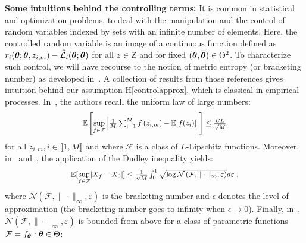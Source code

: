 \documentclass{article}
\newcommand*{\Scale}[2][4]{\scalebox{#1}{$#2$}}%
\begin{document}
\textbf{Some intuitions behind the controlling terms:} It is  common in statistical and optimization problems, to deal with the manipulation and the control of random variables indexed by sets with an infinite number of elements. Here, the controlled random variable is an image of a continuous function defined as $r_i (\param ; \op, z_{i,m})  - \sur{i}{\param}{\op}$ for all $z \in \Zset$ and for fixed $(\param, \op) \in \Param^2$.
To characterize such control, we will have recourse to the notion of metric entropy (or bracketing number) as developed in~\cite{van2000asymptotic,vershynin2018high,wainwright2019high}.
A collection of results from those references gives intuition behind our assumption H\ref{controlapprox}, which is classical in empirical processes.
In~\cite[Theorem 8.2.3]{vershynin2018high}, the authors recall the uniform law of large numbers:\vspace{0.05in}
\[\Scale[0.9]{\EE \left[\underset{f \in \mathcal{F}}{ \sup } \left|\frac{1}{M} \sum_{i=1}^{M} f\left(z_{i,m}\right)-\EE[f(z_i)]\right| \right] \leq \frac{C L}{\sqrt{M}} }\]
\vspace{0.05in}
for all $z_{i,m}, i \in \llbracket 1, M \rrbracket$ and where $\mathcal{F}$ is a class of $L$-Lipschitz functions.
Moreover, in~\cite[Theorem 8.1.3 ]{vershynin2018high} and~\cite[Theorem 5.22]{wainwright2019high}, the application of the Dudley inequality yields:
\vspace{0.05in}
\[\Scale[0.9]{\EE [ \underset{f \in \mathcal{F}}{\sup} |X_{f}-X_{0} | ] \leq \frac{1}{\sqrt{M}} \int_{0}^{1} \sqrt{\log \mathcal{N}\left(\mathcal{F},\|\cdot\|_{\infty}, \varepsilon\right)} d \varepsilon\eqsp,}\]
\vspace{0.05in}
where $\mathcal{N}\left(\mathcal{F},\|\cdot\|_{\infty}, \varepsilon\right)$ is the bracketing number and $\epsilon$ denotes the level of approximation (the bracketing number goes to infinity when $\epsilon  \to 0$). Finally, in~\cite[p.271, Example]{van2000asymptotic}, $\mathcal{N}\left(\mathcal{F},\|\cdot\|_{\infty}, \varepsilon\right)$ is bounded from above for a class of parametric functions $ \mathcal{F}= {f_{\param}: \param \in \Param}$:
\end{document}
